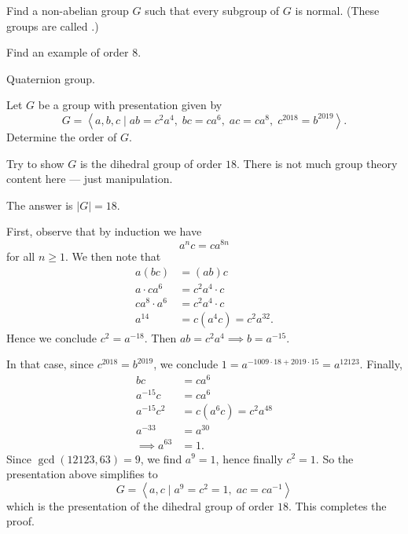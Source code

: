 \begin{problem}
	\onechili
	Find a non-abelian group $G$
	such that every subgroup of $G$ is normal.
	(These groups are called .)
	\begin{hint}
		Find an example of order $8$.
	\end{hint}
	\begin{sol}
		Quaternion group.
	\end{sol}
\end{problem}

\begin{problem}
	\onechili
	Let $G$ be a group with presentation given by
	\[ G = \left< a,b,c \mid
		ab = c^2a^4, \; bc = ca^6, \; ac = ca^8, \;
		c^{2018} = b^{2019}
		\right>. \]
	Determine the order of $G$.
	\begin{hint}
		Try to show $G$ is the dihedral group of order $18$.
		There is not much group theory content here --- just manipulation.
	\end{hint}
	\begin{sol}
		The answer is $|G| = 18$.

		First, observe that by induction we have
		\[ a^n c = ca^{8n} \]
		for all $n \ge 1$.
		We then note that
		\begin{align*}
			a(bc) &= (ab)c \\
			a \cdot ca^6 &= c^2 a^4 \cdot c \\
			c a^8 \cdot a^6 &= c^2 a^4 \cdot c \\
			a^{14} &= c(a^4c) = c^2 a^{32}.
		\end{align*}
		Hence we conclude $c^2 = a^{-18}$.
		Then $ab = c^2a^4 \implies b = a^{-15}$.

		In that case, since $c^{2018} = b^{2019}$,
		we conclude $1 = a^{- 1009 \cdot 18 + 2019 \cdot 15} = a^{12123}$.
		Finally,
		\begin{align*}
			bc &= ca^6 \\
			a^{-15} c &= ca^6 \\
			a^{-15} c^2 &= c(a^6c) = c^2 a^{48} \\
			a^{-33} &= a^{30} \\
			\implies a^{63} &= 1.
		\end{align*}
		Since $\gcd(12123, 63) = 9$, we find $a^9 = 1$, hence finally $c^2 = 1$.
		So the presentation above simplifies to
		\[ G = \left< a,c \mid a^9=c^2=1, \; ac = ca^{-1} \right> \]
		which is the presentation of the dihedral group of order $18$.
		This completes the proof.
	\end{sol}
\end{problem}

